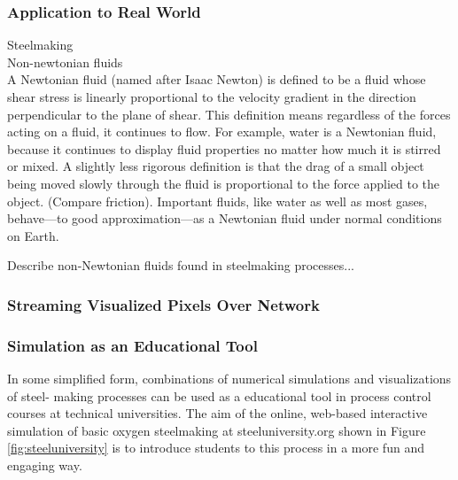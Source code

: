 \subsubsection{Application to Real World}

Steelmaking \\
Non-newtonian fluids \\



A Newtonian fluid (named after Isaac Newton) is defined to be a fluid whose shear stress is linearly proportional to the velocity gradient in the direction perpendicular to the plane of shear. This definition means regardless of the forces acting on a fluid, it continues to flow. For example, water is a Newtonian fluid, because it continues to display fluid properties no matter how much it is stirred or mixed. A slightly less rigorous definition is that the drag of a small object being moved slowly through the fluid is proportional to the force applied to the object. (Compare friction). Important fluids, like water as well as most gases, behave—to good approximation—as a Newtonian fluid under normal conditions on Earth.

Describe non-Newtonian fluids found in steelmaking processes...

\subsubsection{Streaming Visualized Pixels Over Network}

\subsubsection{Simulation as an Educational Tool}

In some simplified form, combinations of numerical simulations and visualizations of steel- making processes can be used as a educational tool in process control courses at technical universities. The aim of the online, web-based interactive simulation of basic oxygen steelmaking at steeluniversity.org shown in Figure~ \ref{fig:steeluniversity} is to introduce students to this process in a more fun and engaging way.

